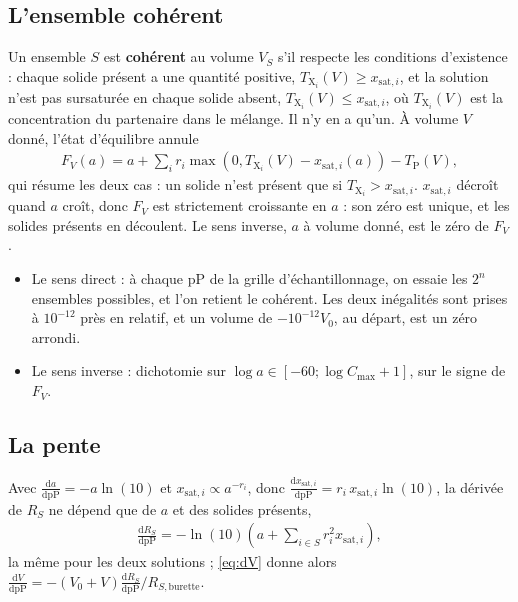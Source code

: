 \documentclass[a4paper,11pt]{article}
\newcommand\gras[1]{\textbf{#1}}
\newcommand\pP{\ensuremath{\mathrm{pP}}\xspace}
\newcommand\ddp[2]{\frac{\mathrm{d}#1}{\mathrm{d}#2}}
\newcommand\pare[1]{\left(#1\right)}
\begin{document}
\subsection{L'ensemble cohérent}
Un ensemble $S$ est \gras{cohérent} au volume $V_S$ s'il respecte les conditions d'existence : chaque solide présent a une quantité positive, $T_{\mathrm X_i}(V)\ge x_{\text{sat},i}$, et la solution n'est pas sursaturée en chaque solide absent, $T_{\mathrm X_i}(V)\le x_{\text{sat},i}$, où $T_{\mathrm X_i}(V)$ est la concentration du partenaire dans le mélange.
Il n'y en a qu'un.
À volume $V$ donné, l'état d'équilibre annule
\begin{align}
F_V(a)=a+\sum_ir_i\max\pare{0,T_{\mathrm X_i}(V)-x_{\text{sat},i}(a)}-T_\mathrm P(V),
\end{align}
qui résume les deux cas : un solide n'est présent que si $T_{\mathrm X_i}>x_{\text{sat},i}$.
$x_{\text{sat},i}$ décroît quand $a$ croît, donc $F_V$ est strictement croissante en $a$ : son zéro est unique, et les solides présents en découlent.
Le sens inverse, $a$ à volume donné, est le zéro de $F_V$.
\begin{algo}
\begin{itemize}
\item Le sens direct : à chaque \pP de la grille d'échantillonnage, on essaie les $2^n$ ensembles possibles, et l'on retient le cohérent.
Les deux inégalités sont prises à $10^{-12}$ près en relatif, et un volume de $-10^{-12}V_0$, au départ, est un zéro arrondi.
\item Le sens inverse : dichotomie sur $\log a\in[-60;\log C_\text{max}+1]$, sur le signe de $F_V$.
\end{itemize}
\end{algo}

\subsection{La pente}
Avec $\ddp a\pP=-a\ln(10)$ et $x_{\text{sat},i}\propto a^{-r_i}$, donc $\ddp{x_{\text{sat},i}}\pP=r_i\,x_{\text{sat},i}\ln(10)$, la dérivée de $R_S$ ne dépend que de $a$ et des solides présents,
\begin{align}
\ddp{R_S}\pP=-\ln(10)\pare{a+\sum_{i\in S}r_i^2x_{\text{sat},i}},
\end{align}
la même pour les deux solutions ; \eqref{eq:dV} donne alors $\ddp V\pP=-(V_0+V)\ddp{R_S}\pP\Big/R_{S,\text{burette}}$.
\end{document}
